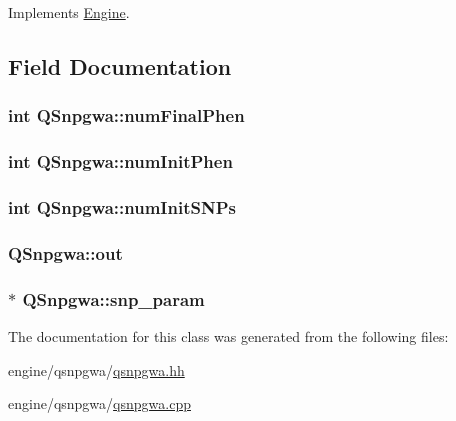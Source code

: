 Implements \hyperlink{classEngine_a2927c4a4263809453063ad482c6434a4}{Engine}.



\subsection{Field Documentation}
\hypertarget{classQSnpgwa_ac7f80fcdcd53d7f8265bdd0591ea5fc9}{
\subsubsection[{numFinalPhen}]{\setlength{\rightskip}{0pt plus 5cm}int {\bf QSnpgwa::numFinalPhen}}}
\label{classQSnpgwa_ac7f80fcdcd53d7f8265bdd0591ea5fc9}
\hypertarget{classQSnpgwa_a04b7ca3253113ce5e2f5b9e1421161a1}{
\subsubsection[{numInitPhen}]{\setlength{\rightskip}{0pt plus 5cm}int {\bf QSnpgwa::numInitPhen}}}
\label{classQSnpgwa_a04b7ca3253113ce5e2f5b9e1421161a1}
\hypertarget{classQSnpgwa_a8134614250816926749e019ab6654344}{
\subsubsection[{numInitSNPs}]{\setlength{\rightskip}{0pt plus 5cm}int {\bf QSnpgwa::numInitSNPs}}}
\label{classQSnpgwa_a8134614250816926749e019ab6654344}
\hypertarget{classQSnpgwa_a0a854b526dee6f1552f280e63068e0a5}{
\subsubsection[{out}]{ {\bf QSnpgwa::out}}}
\label{classQSnpgwa_a0a854b526dee6f1552f280e63068e0a5}
\hypertarget{classQSnpgwa_a357c8bf58fba34a5076eeb8f61a3cacb}{
\subsubsection[{snp\_\-param}]{$\ast$ {\bf QSnpgwa::snp\_\-param}}}
\label{classQSnpgwa_a357c8bf58fba34a5076eeb8f61a3cacb}


The documentation for this class was generated from the following files:\begin{DoxyCompactItemize}
\item 
engine/qsnpgwa/\hyperlink{qsnpgwa_8hh}{qsnpgwa.hh}\item 
engine/qsnpgwa/\hyperlink{qsnpgwa_8cpp}{qsnpgwa.cpp}\end{DoxyCompactItemize}
